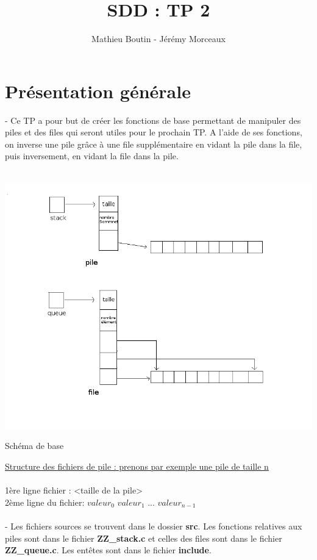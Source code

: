 \documentclass[a4paper]{article}
\title{SDD : TP 2}
\author{Mathieu Boutin - Jérémy Morceaux}
\begin{document}
\maketitle
\section{Présentation générale}
- Ce TP a pour but de créer les fonctions de base permettant de manipuler des piles et des files qui seront utiles pour le prochain TP. A l'aide de ses fonctions, on inverse une pile grâce à une file supplémentaire en vidant la pile dans la file, puis inversement, en vidant la file dans la pile.
\\
\\
\begin{center}
\includegraphics[scale=0.4]{Schema_base.png}

Schéma de base
\end{center}
\underline{Structure des fichiers de pile : prenons par exemple une pile de taille n}
\\
\\
1ère ligne fichier : <taille de la pile>
\\
2ème ligne du fichier: $valeur_{0}$ $valeur_{1}$  ... $valeur_{n-1}$
\\
\\
- Les fichiers sources se trouvent dans le dossier \textbf{src}. Les fonctions relatives aux piles sont dans le fichier \textbf{ZZ\_stack.c} et celles des files sont dans le fichier \textbf{ZZ\_queue.c}. Les entêtes sont dans le fichier \textbf{include}.
\end{document}
